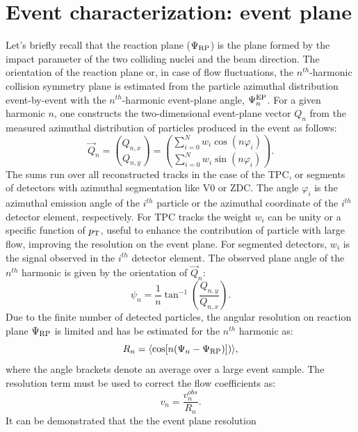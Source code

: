 \section{Event characterization: event plane}
\label{sec:EventPlane}
Let's briefly recall that the reaction plane ($\Psi_{\rm RP}$) is the 
plane formed by the impact parameter of the two colliding nuclei and the beam
direction. The orientation of the reaction plane or, in case of flow fluctuations, 
the $n^{th}$-harmonic collision symmetry plane is estimated 
from the particle azimuthal distribution event-by-event
with the $n^{th}$-harmonic event-plane angle, $\Psi_n^{\rm EP}$.
For a given harmonic $n$, one constructs the two-dimensional event-plane 
vector $Q_n$ from the measured azimuthal distribution of 
particles produced in the event as follows:
\begin{equation}
\label{f:qvector}
 \vec{Q}_n= {Q_{n,x} \choose Q_{n,y}} = {\sum_{i=0}^{N} w_i \cos (n\varphi_i) \choose \sum_{i=0}^{N} w_i \sin (n\varphi_i)}.
\end{equation}
The sums run over all reconstructed tracks in the case 
of the TPC, or segments of detectors with azimuthal 
segmentation like V0 or ZDC. The angle $\varphi_i$ is 
the azimuthal emission angle of the $i^{th}$ particle or the 
azimuthal coordinate of the $i^{th}$ detector element, respectively. 
For TPC tracks the weight $w_i$ can be unity or a specific 
function of $p_{\rm T}$, useful to enhance the 
contribution of particle with large flow, improving 
the resolution on the event plane. For segmented detectors, $w_i$ is the 
signal observed in the $i^{th}$ detector element. The observed plane 
angle of the $n^{th}$ harmonic is given by the orientation of $\vec{Q}_n$:
\begin{equation}
\psi_n = \dfrac{1}{n} \tan^{-1} \left(\dfrac{Q_{n,y}}{Q_{n,x}}\right).
\end{equation}
Due to the finite number of detected particles, the
angular resolution on reaction plane $\Psi_{\rm RP}$ is limited and 
has be estimated for the $n^{th}$ harmonic as:
\begin{equation}
R_n = \langle {\rm cos}[n({\rm \Psi}_n-{\rm \Psi}_{\rm RP})]) \rangle ,
\end{equation}
where the angle brackets denote an average over a large event sample.
The resolution term must be used to correct the flow coefficients as:
\begin{equation}
v_n = \frac{v_n^{obs}}{R_n}.
\end{equation}
It can be demonstrated that the the event plane resolution 
